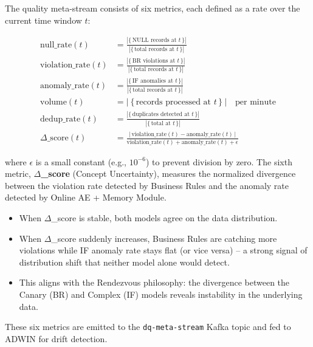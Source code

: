 The quality meta-stream consists of six metrics, each defined as a rate over the current time window $t$:

\begin{align}
\text{null\_rate}(t) &= \frac{|\{\,\text{NULL records at }t\,\}|}{|\{\,\text{total records at }t\,\}|} \label{eq:null_rate} \\[6pt]
\text{violation\_rate}(t) &= \frac{|\{\,\text{BR violations at }t\,\}|}{|\{\,\text{total records at }t\,\}|} \label{eq:violation_rate} \\[6pt]
\text{anomaly\_rate}(t) &= \frac{|\{\,\text{IF anomalies at }t\,\}|}{|\{\,\text{total records at }t\,\}|} \label{eq:anomaly_rate} \\[6pt]
\text{volume}(t) &= |\ \{\,\text{records processed at }t\,\}\ | \quad \text{per minute} \label{eq:volume} \\[6pt]
\text{dedup\_rate}(t) &= \frac{|\{\,\text{duplicates detected at }t\,\}|}{|\{\,\text{total at }t\,\}|} \label{eq:dedup_rate} \\[6pt]
\Delta\_\text{score}(t) &= \frac{\big|\,\text{violation\_rate}(t) - \text{anomaly\_rate}(t)\,\big|}
                                   {\text{violation\_rate}(t) + \text{anomaly\_rate}(t) + \epsilon} \label{eq:delta_score}
\end{align}

\noindent where $\epsilon$ is a small constant (e.g., $10^{-6}$) to prevent division by zero. The sixth metric, \textbf{$\Delta$\_score} (Concept Uncertainty), measures the normalized divergence between the violation rate detected by Business Rules and the anomaly rate detected by Online AE + Memory Module.

\begin{itemize}
    \item When $\Delta$\_score is stable, both models agree on the data distribution.
    \item When $\Delta$\_score suddenly increases, Business Rules are catching more violations while IF anomaly rate stays flat (or vice versa) -- a strong signal of distribution shift that neither model alone would detect.
    \item This aligns with the Rendezvous philosophy: the divergence between the Canary (BR) and Complex (IF) models reveals instability in the underlying data.
\end{itemize}

These six metrics are emitted to the \texttt{dq-meta-stream} Kafka topic and fed to ADWIN for drift detection.

